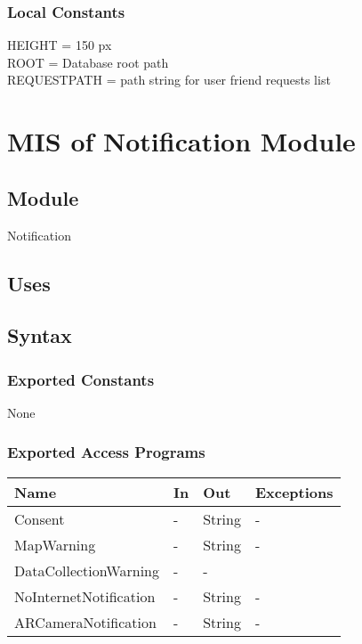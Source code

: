 \documentclass[12pt, titlepage]{article}
\begin{document}
\subsubsection{Local Constants}
HEIGHT = 150 px\\
ROOT = Database root path\\
REQUESTPATH = path string for user friend requests list

\newpage

\section{MIS of Notification Module} \label{mNotify}

\subsection{Module}

Notification

\subsection{Uses}

\subsection{Syntax}

\subsubsection{Exported Constants}
None

\subsubsection{Exported Access Programs}
\begin{center}
\begin{tabular}{p{4cm} p{2cm} p{4cm} p{4cm}}
\hline
\textbf{Name} & \textbf{In} & \textbf{Out} & \textbf{Exceptions} \\
\hline
Consent & - & String & - \\
MapWarning & - & String & - \\
DataCollectionWarning & - & -\\
NoInternetNotification & - & String & -\\
ARCameraNotification & - & String & -\\
\hline
\end{tabular}
\end{center}
\end{document}

